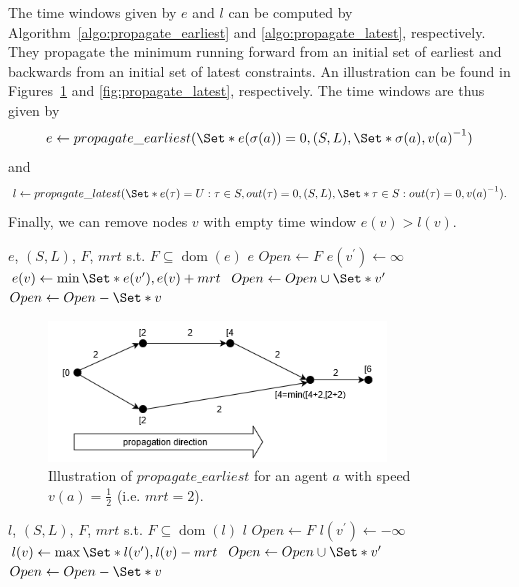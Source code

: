 \documentclass{article}
\DeclareMathOperator{\dom}{dom}
\begin{document}
The time windows given by $e$ and $l$ can be computed by Algorithm~\ref{algo:propagate_earliest} and \ref{algo:propagate_latest}, respectively. They propagate the minimum running forward from an initial set of earliest and backwards from an initial set of latest constraints. An illustration can be found in Figures~\ref{fig:propagate_earliest} and \ref{fig:propagate_latest}, respectively.
The time windows are thus given by
$$e\leftarrow propagate\_earliest(\Set*{e(\sigma(a))=0}, (S,L), \Set*{\sigma(a)}, {v(a)}^{-1})$$ and $$l\leftarrow propagate\_latest(\Set*{e(\tau)=U: \tau \in S, out(\tau)=0}, (S,L), \Set*{\tau \in S: out(\tau)=0},{v(a)}^{-1}).$$
Finally, we can remove nodes $v$ with empty time window $e(v)>l(v)$.





\begin{algorithm}
	\caption{$propagate\_earliest$} \label{algo:propagate_earliest}
	\begin{algorithmic}[1]
	    \Require $e$, $(S,L)$, $F$, $mrt$ s.t. $F\subseteq \dom(e)$
	    \Ensure $e$
	    \State $Open \leftarrow F$
    	        \If{$v^\prime \not\in \dom(e)$}
    	            \State $e(v^\prime) \leftarrow \infty$
    	        \EndIf
    			\State $e(v) \leftarrow \min \Set*{e(v^\prime), e(v)+mrt}$
    			\State $Open \leftarrow Open \cup \Set*{v^\prime}$
    		\EndFor
			\State $Open \leftarrow Open - \Set*{v}$
		\EndFor
	\end{algorithmic}
\end{algorithm}

\begin{figure}[hbtp]
	\centering
  \includegraphics[width=0.8\textwidth]{H1_propagate_earliest.png}
	\caption{Illustration of $propagate\_earliest$ for an agent $a$ with speed $v(a)=\frac{1}{2}$ (i.e. $mrt=2$).}
	\label{fig:propagate_earliest}
\end{figure}


\begin{algorithm}
	\caption{$propagate\_latest$} \label{algo:propagate_latest}
	\begin{algorithmic}[1]
	    \Require $l$, $(S,L)$, $F$, $mrt$  s.t. $F\subseteq \dom(l)$
	    \Ensure $l$
	    \State $Open \leftarrow F$
    	        \If{$v^\prime \not\in \dom(l)$}
    	            \State $l(v^\prime) \leftarrow -\infty$
    	        \EndIf
    			\State $l(v) \leftarrow \max \Set*{l(v^\prime), l(v)-mrt}$
    			\State $Open \leftarrow Open \cup \Set*{v^\prime}$
    		\EndFor
			\State $Open \leftarrow Open - \Set*{v}$
		\EndFor
	\end{algorithmic}
\end{algorithm}
\end{document}
